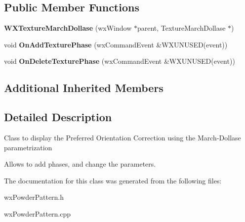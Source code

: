 \subsection*{Public Member Functions}
\begin{DoxyCompactItemize}
\item 
\mbox{\label{class_obj_cryst_1_1_w_x_texture_march_dollase_ab8ab6eceeb0c83bf6dc4b6f775e02905}} 
{\bfseries W\+X\+Texture\+March\+Dollase} (wx\+Window $\ast$parent, Texture\+March\+Dollase $\ast$)
\item 
\mbox{\label{class_obj_cryst_1_1_w_x_texture_march_dollase_aafd20a474b15713ea0c4fea247a254be}} 
void {\bfseries On\+Add\+Texture\+Phase} (wx\+Command\+Event \&W\+X\+U\+N\+U\+S\+ED(event))
\item 
\mbox{\label{class_obj_cryst_1_1_w_x_texture_march_dollase_ae0f2b94788268422e5a2ca215f49387a}} 
void {\bfseries On\+Delete\+Texture\+Phase} (wx\+Command\+Event \&W\+X\+U\+N\+U\+S\+ED(event))
\end{DoxyCompactItemize}
\subsection*{Additional Inherited Members}


\subsection{Detailed Description}
Class to display the Preferred Orientation Correction using the March-\/\+Dollase parametrization

Allows to add phases, and change the parameters. 

The documentation for this class was generated from the following files\+:\begin{DoxyCompactItemize}
\item 
wx\+Powder\+Pattern.\+h\item 
wx\+Powder\+Pattern.\+cpp\end{DoxyCompactItemize}
